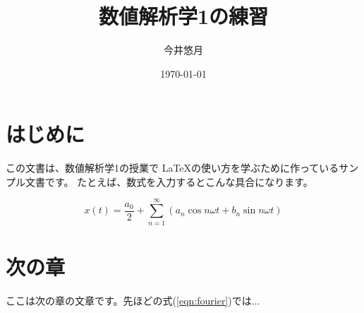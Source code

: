 \documentclass{jarticle}
\title{数値解析学1の練習}
\author{今井悠月}
\date{\today}
\begin{document}
\maketitle

\section{はじめに}

この文書は、数値解析学1の授業で \LaTeX の使い方を学ぶために作っているサンプル文書です。
たとえば、数式を入力するとこんな具合になります。

\begin{equation}
x(t) = \frac{a_0}{2} + \sum_{n=1}^{\infty} \left ( a_n \cos n\omega t + b_n \sin n\omega t \right )
\label{eqn:fourier}
\end{equation}

\section{次の章}

ここは次の章の文章です。先ほどの式(\ref{eqn:fourier})では...
\end{document}
